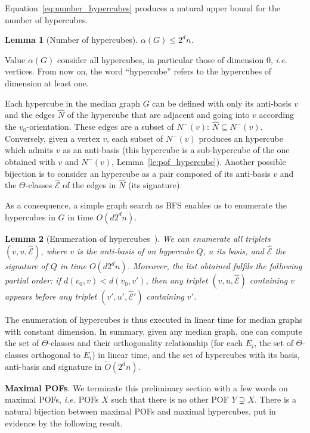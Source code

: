 \documentclass{article}
\newtheorem{lemma}{Lemma}
\begin{document}
Equation~\eqref{eq:number_hypercubes} produces a natural upper bound for the number of hypercubes.

\begin{lemma}[Number of hypercubes]
$\alpha(G)\le 2^dn$.
\label{le:number_hypercubes}
\end{lemma}

Value $\alpha(G)$ consider all hypercubes, in particular those of dimension 0, {\em i.e.} vertices. From now on, the word ``hypercube'' refers to the hypercubes of dimension at least one.

Each hypercube in the median graph $G$ can be defined with only its anti-basis $v$ and the edges $\widehat{N}$ of the hypercube that are adjacent and going into $v$ according the $v_0$-orientation. These edges are a subset of $N^-(v)$: $\widehat{N} \subseteq N^-(v)$. Conversely, given a vertex $v$, each subset of $N^-(v)$ produces an hypercube which admits $v$ as an anti-basis (this hypercube is a sub-hypercube of the one obtained with $v$ and $N^-(v)$, Lemma~\ref{le:pof_hypercube}). Another possible bijection is to consider an hypercube as a pair composed of its anti-basis $v$ and the $\Theta$-classes $\widehat{\mathcal{E}}$ of the edges in $\widehat{N}$ (its signature).

As a consequence, a simple graph search as BFS enables us to enumerate the hypercubes in $G$ in time $O(d2^dn)$.

\begin{lemma}[Enumeration of hypercubes~\cite{BeHa21}]
We can enumerate all triplets $(v,u,\widehat{\mathcal{E}})$, where $v$ is the anti-basis of an hypercube $Q$, $u$ its basis, and $\widehat{\mathcal{E}}$ the signature of $Q$ in time $O(d2^dn)$. Moreover, the list obtained fulfils the following partial order: if $d(v_0,v) < d(v_0,v')$, then any triplet $(v,u,\widehat{\mathcal{E}})$ containing $v$ appears before any triplet $(v',u',\widehat{\mathcal{E}}')$ containing $v'$.
\label{le:enum_hypercubes}
\end{lemma}

The enumeration of hypercubes is thus executed in linear time for median graphs with constant dimension. In summary, given any median graph, one can compute the set of $\Theta$-classes and their orthogonality relationship (for each $E_i$, the set of $\Theta$-classes orthogonal to $E_i$) in linear time, and the set of hypercubes with its basis, anti-basis and signature in $\tilde{O}(2^dn)$.

\textbf{Maximal POFs}. We terminate this preliminary section with a few words on maximal POFs, {\em i.e.} POFs $X$ such that there is no other POF $Y \supsetneq X$. There is a natural bijection between maximal POFs and maximal hypercubes, put in evidence by the following result.
\end{document}
